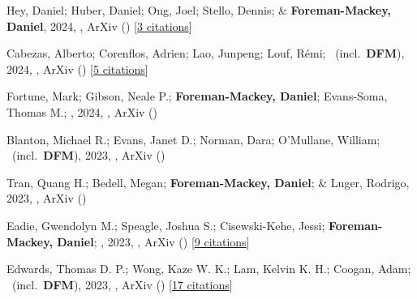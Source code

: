 \item[{\color{numcolor}\scriptsize58}] Hey, Daniel; Huber, Daniel; Ong, Joel; Stello, Dennis; \& \textbf{Foreman-Mackey, Daniel}, 2024, , ArXiv () [\href{https://ui.adsabs.harvard.edu/abs/2024arXiv240302489H}{3 citations}]

\item[{\color{numcolor}\scriptsize57}] Cabezas, Alberto; Corenflos, Adrien; Lao, Junpeng; Louf, R{\'e}mi; \etal\ (incl.\ \textbf{DFM}), 2024, , ArXiv () [\href{https://ui.adsabs.harvard.edu/abs/2024arXiv240210797C}{5 citations}]

\item[{\color{numcolor}\scriptsize56}] Fortune, Mark; Gibson, Neale P.; \textbf{Foreman-Mackey, Daniel}; Evans-Soma, Thomas M.; \etal, 2024, , ArXiv ()

\item[{\color{numcolor}\scriptsize55}] Blanton, Michael R.; Evans, Janet D.; Norman, Dara; O'Mullane, William; \etal\ (incl.\ \textbf{DFM}), 2023, , ArXiv ()

\item[{\color{numcolor}\scriptsize54}] Tran, Quang H.; Bedell, Megan; \textbf{Foreman-Mackey, Daniel}; \& Luger, Rodrigo, 2023, , ArXiv ()

\item[{\color{numcolor}\scriptsize53}] Eadie, Gwendolyn M.; Speagle, Joshua S.; Cisewski-Kehe, Jessi; \textbf{Foreman-Mackey, Daniel}; \etal, 2023, , ArXiv () [\href{https://ui.adsabs.harvard.edu/abs/2023arXiv230204703E}{9 citations}]

\item[{\color{numcolor}\scriptsize52}] Edwards, Thomas D. P.; Wong, Kaze W. K.; Lam, Kelvin K. H.; Coogan, Adam; \etal\ (incl.\ \textbf{DFM}), 2023, , ArXiv () [\href{https://ui.adsabs.harvard.edu/abs/2023arXiv230205329E}{17 citations}]


